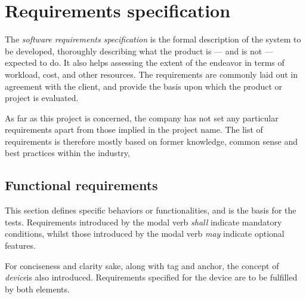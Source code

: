 \section{Requirements specification}\label{sec:reqs}
The \emph{software requirements specification} is the formal description of the system to be developed, thoroughly describing what the product is --- and is not --- expected to do.
It also helps assessing the extent of the endeavor in terms of workload, cost, and other resources.
The requirements are commonly laid out in agreement with the client, and provide the basis upon which the product or project is evaluated.

As far as this project is concerned, the company has not set any particular requirements apart from those implied in the project name.
The list of requirements is therefore mostly based on former knowledge, common sense and best practices within the industry,


\subsection{Functional requirements}\label{subsec:req_func}
This section defines specific behaviors or functionalities, and is the basis for the tests.
Requirements introduced by the modal verb \emph{shall} indicate mandatory conditions, whilst those introduced by the modal verb \emph{may} indicate optional features.

For conciseness and clarity sake, along with tag and anchor, the concept of \emph{device}is also introduced.
Requirements specified for the device are to be fulfilled by both elements.

